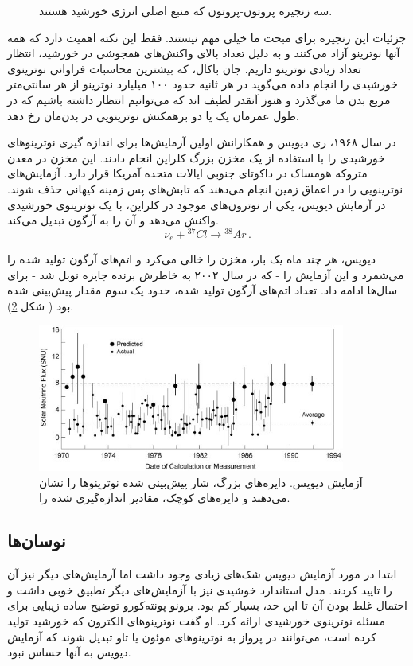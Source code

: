 \documentclass[a4paper,11pt,oneside,openany]{iut-thesis}
\begin{document}
\begin{figure}
	\caption{
سه زنجیره پروتون-پروتون	که منبع اصلی انرژی خورشید هستند.
}
	\label{pp}
\end{figure}

جزئیات این زنجیره برای مبحث ما خیلی مهم نیستند. فقط این نکته اهمیت دارد که همه آنها نوترینو آزاد می‌کنند و به دلیل تعداد بالای واکنش‌های همجوشی در خورشید، انتظار تعداد زیادی نوترینو داریم. جان باکال، که بیشترین محاسبات فراوانی نوترینوی خورشیدی را انجام داده می‌گوید در هر ثانیه حدود ۱۰۰ میلیارد نوترینو از هر سانتی‌متر مربع بدن ما می‌گذرد و هنوز آنقدر لطیف اند که می‌توانیم انتظار داشته باشیم که در طول عمرمان یک یا دو برهمکنش نوترینویی در بدن‌مان رخ دهد.

در سال ۱۹۶۸، ری دیویس و همکارانش اولین آزمایش‌ها برای اندازه گیری نوترینوهای خورشیدی را با استفاده از یک مخزن بزرگ کلراین انجام دادند. این مخزن در معدن متروکه هومساک در داکوتای جنوبی ایالات متحده آمریکا قرار دارد. آزمایش‌های نوترینویی را در اعماق زمین انجام می‌دهند که تابش‌های پس زمینه کیهانی حذف شوند. در آزمایش دیویس، یکی از نوترون‌های موجود در کلراین، با یک نوترینوی خورشیدی واکنش می‌دهد و آن را به آرگون تبدیل می‌کند.
\begin{equation}
	\nu_{e} + {^{37}Cl} \rightarrow {^{38}Ar}\,.
\end{equation}

دیویس، هر چند ماه یک بار، مخزن را خالی می‌کرد و اتم‌های آرگون تولید شده را می‌شمرد و این آزمایش را - که در سال ۲۰۰۲ به خاطرش برنده جایزه نوبل شد - برای سال‌ها ادامه داد. تعداد اتم‌های آرگون تولید شده، حدود یک سوم مقدار پیش‌بینی شده بود ( شکل
\ref{davis}).


\begin{figure}
	\includegraphics[angle=0,width=0.9\textwidth,clip=0]{davis}
	\caption{
		آزمایش دیویس. دایره‌های بزرگ، شار پیش‌بینی شده نوترینوها را نشان می‌دهند و دایره‌های کوچک، مقادیر اندازه‌گیری شده را.
	}
	\label{davis}
\end{figure}

\subsection{
نوسان‌ها
}
ابتدا در مورد آزمایش دیویس شک‌های زیادی وجود داشت اما آزمایش‌های دیگر نیز آن را تایید کردند. مدل استاندارد خوشیدی نیز با آزمایش‌های دیگر تطبیق خوبی داشت و احتمال غلط بودن آن تا این حد، بسیار کم بود. برونو پونته‌کورو توضیح ساده زیبایی برای مسئله نوترینوی خورشیدی ارائه کرد. او گفت نوترینوهای الکترون که خورشید تولید کرده است، می‌توانند در پرواز به نوترینوهای موئون یا تاو تبدیل شوند که آزمایش دیویس به آنها حساس نبود.
\end{document}
